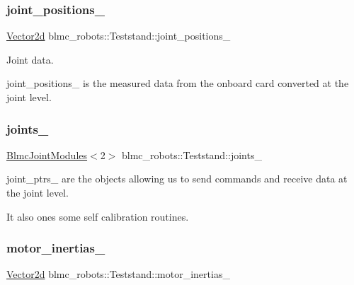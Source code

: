 \subsubsection{\texorpdfstring{joint\+\_\+positions\+\_\+}{joint\_positions\_}}
{\footnotesize\ttfamily \hyperlink{common__header_8hpp_acb6916bc8c9fe9d98c484fd4cc201447}{Vector2d} blmc\+\_\+robots\+::\+Teststand\+::joint\+\_\+positions\+\_\+\hspace{0.3cm}{\ttfamily [private]}}



Joint data. 

joint\+\_\+positions\+\_\+ is the measured data from the onboard card converted at the joint level. \mbox{\label{classblmc__robots_1_1Teststand_a2c14882d88deb56edde5240a8d841f2a}} 
\subsubsection{\texorpdfstring{joints\+\_\+}{joints\_}}
{\footnotesize\ttfamily \hyperlink{classblmc__robots_1_1BlmcJointModules}{Blmc\+Joint\+Modules}$<$2$>$ blmc\+\_\+robots\+::\+Teststand\+::joints\+\_\+\hspace{0.3cm}{\ttfamily [private]}}



joint\+\_\+ptrs\+\_\+ are the objects allowing us to send commands and receive data at the joint level. 

It also ones some self calibration routines. \mbox{\label{classblmc__robots_1_1Teststand_afe8801388760cd85771a99e3a89c9f69}} 
\subsubsection{\texorpdfstring{motor\+\_\+inertias\+\_\+}{motor\_inertias\_}}
{\footnotesize\ttfamily \hyperlink{common__header_8hpp_acb6916bc8c9fe9d98c484fd4cc201447}{Vector2d} blmc\+\_\+robots\+::\+Teststand\+::motor\+\_\+inertias\+\_\+\hspace{0.3cm}{\ttfamily [private]}}



